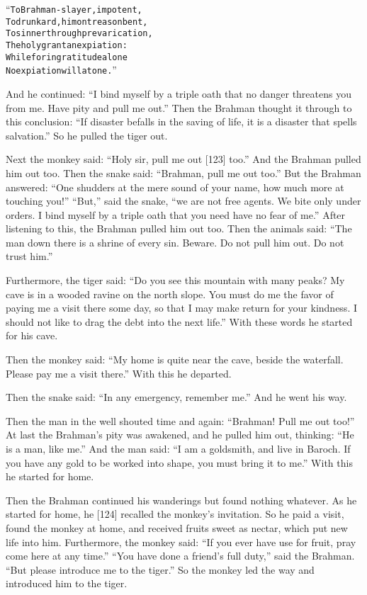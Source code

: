 \documentclass{article}
\renewenvironment{verbatim}{\begin{alltt}\normalfont\begin{centering}}{\end{centering}\end{alltt}}
\begin{document}
\begin{verbatim}
“To Brahman-slayer, impotent,
To drunkard, him on treason bent,
To sinner through prevarication,
The holy grant an expiation:
While for ingratitude alone
No expiation will atone.”
\end{verbatim}
And he continued:
``I bind myself by a triple oath that no danger threatens you from me. Have pity and pull me out.''
Then the Brahman thought it through to this conclusion:
``If disaster befalls in the saving of life, it is a disaster that spells salvation.''
So he pulled the tiger out.

Next the monkey said: ``Holy sir, pull me out [123] too.'' And the
Brahman pulled him out too. Then the snake said:
``Brahman, pull me out too.'' But the Brahman answered:
``One shudders at the mere sound of your name, how much more at touching you!''
``But,'' said the snake,
``we are not free agents. We bite only under orders. I bind myself by a triple oath that you need have no fear of me.''
After listening to this, the Brahman pulled him out too. Then the
animals said:
``The man down there is a shrine of every sin. Beware. Do not pull him out. Do not trust him.''

Furthermore, the tiger said:
``Do you see this mountain with many peaks? My cave is in a wooded ravine on the north slope. You must do me the favor of paying me a visit there some day, so that I may make return for your kindness. I should not like to drag the debt into the next life.''
With these words he started for his cave.

Then the monkey said:
``My home is quite near the cave, beside the waterfall. Please pay me a visit there.''
With this he departed.

Then the snake said: ``In any emergency, remember me.'' And he went
his way.

Then the man in the well shouted time and again:
``Brahman! Pull me out too!'' At last the Brahman's pity was
awakened, and he pulled him out, thinking:
``He is a man, like me.'' And the man said:
``I am a goldsmith, and live in Baroch. If you have any gold to be worked into shape, you must bring it to me.''
With this he started for home.

Then the Brahman continued his wanderings but found nothing
whatever. As he started for home, he [124] recalled the monkey's
invitation. So he paid a visit, found the monkey at home, and
received fruits sweet as nectar, which put new life into him.
Furthermore, the monkey said:
``If you ever have use for fruit, pray come here at any time.''
``You have done a friend's full duty,'' said the Brahman.
``But please introduce me to the tiger.'' So the monkey led the way
and introduced him to the tiger.
\end{document}
